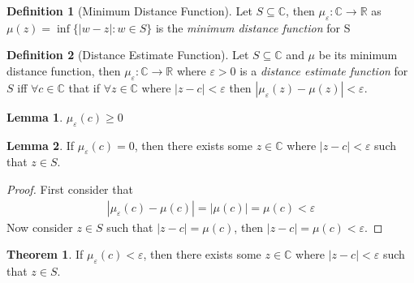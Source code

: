 \documentclass[12pt]{article}
\theoremstyle{definition}
\newtheorem{definition}{Definition}
\theoremstyle{definition}
\newtheorem{theorem}{Theorem}
\theoremstyle{definition}
\newtheorem{lemma}{Lemma}
\theoremstyle{definition}
\begin{document}
\begin{flushleft}

\begin{definition}[Minimum Distance Function]
    Let $S \subseteq \mathbb{C}$, then $\mu_\varepsilon\colon\mathbb{C}\to\mathbb{R}$ as $\mu(z) = \inf\{ |w - z| : w \in S \}$ is the \textit{minimum distance function} for S
\end{definition}

\begin{definition}[Distance Estimate Function]
    Let $S \subseteq \mathbb{C}$ and $\mu$ be its minimum distance function, then $\mu_\varepsilon\colon\mathbb{C}\to\mathbb{R}$ where $\varepsilon > 0$ is a \textit{distance estimate function} for $S$ iff $\forall c \in \mathbb{C}$ that if $\forall z \in \mathbb{C}$ where $|z - c| < \varepsilon$ then $|\mu_\varepsilon(z) - \mu(z)| < \varepsilon$.
\end{definition}

\begin{lemma}
    $\mu_\varepsilon(c) \geq 0$
\end{lemma}

\begin{lemma}
    If $\mu_\varepsilon(c) = 0$, then there exists some $z \in \mathbb{C}$ where $|z - c| < \varepsilon$ such that $z \in S$.
\end{lemma}
\begin{proof}
    First consider that
    \begin{align*}
        |\mu_\varepsilon(c) - \mu(c)| = |\mu(c)| = \mu(c) < \varepsilon
    \end{align*}
    Now consider $z \in S$ such that $|z - c| = \mu(c)$, then $|z - c| = \mu(c) < \varepsilon$.
\end{proof}

\begin{theorem}
    If $\mu_\varepsilon(c) < \varepsilon$, then there exists some $z \in \mathbb{C}$ where $|z - c| < \varepsilon$ such that $z \in S$.
\end{theorem}


\end{flushleft}
\end{document}
